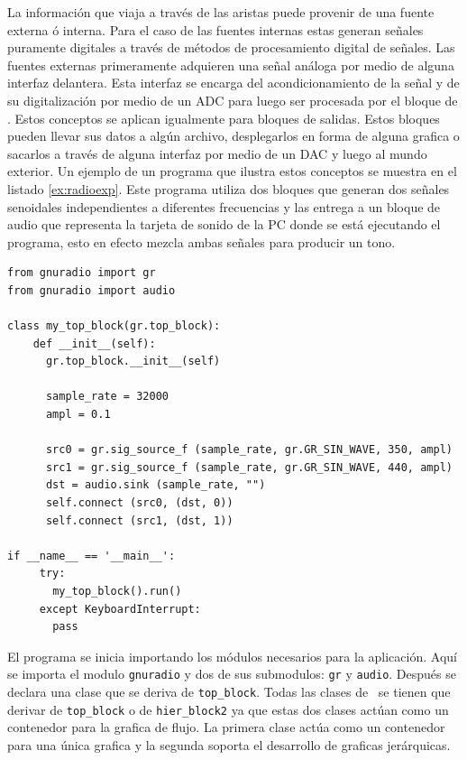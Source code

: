La informaci\'on que viaja a trav\'es de las aristas puede provenir de una fuente
externa \'o interna. Para el caso de las fuentes internas estas generan se\~nales
puramente digitales a trav\'es de m\'etodos de procesamiento digital de
se\~nales. Las fuentes externas primeramente adquieren una se\~nal an\'aloga por
medio de alguna interfaz delantera. Esta interfaz se encarga del
acondicionamiento de la se\~nal y de su digitalizaci\'on por medio de un ADC
para luego ser procesada por el bloque de \gnuradio. Estos conceptos se
aplican igualmente para bloques de salidas. Estos bloques pueden llevar sus
datos a alg\'un archivo, desplegarlos en forma de alguna grafica o sacarlos a
trav\'es de alguna interfaz por medio de un DAC y luego al mundo exterior. Un
ejemplo de un programa que ilustra estos conceptos se muestra en el listado
\ref{ex:radioexp}. Este programa utiliza dos bloques que generan dos se\~nales
senoidales independientes a diferentes frecuencias y las entrega a un bloque de audio que
representa la tarjeta de sonido de la PC donde se est\'a ejecutando el programa,
esto en efecto mezcla ambas se\~nales para producir un tono.


\lstset{language=Python,basicstyle=\footnotesize\sffamily,captionpos=b}
\begin{lstlisting}[float,frame=single,label=ex:radioexp,caption={Ejemplo de programa utilizando \gnuradio}] 
from gnuradio import gr 
from gnuradio import audio

class my_top_block(gr.top_block):
    def __init__(self):
      gr.top_block.__init__(self)

      sample_rate = 32000
      ampl = 0.1

      src0 = gr.sig_source_f (sample_rate, gr.GR_SIN_WAVE, 350, ampl)
      src1 = gr.sig_source_f (sample_rate, gr.GR_SIN_WAVE, 440, ampl)
      dst = audio.sink (sample_rate, "")
      self.connect (src0, (dst, 0))
      self.connect (src1, (dst, 1))

if __name__ == '__main__':
     try:
       my_top_block().run()
     except KeyboardInterrupt:
       pass
\end{lstlisting}

El programa se inicia importando los m\'odulos necesarios para la aplicaci\'on.
Aqu\'i se importa el modulo \verb|gnuradio| y dos de sus submodulos: \verb|gr| y
\verb|audio|. Despu\'es se declara una clase que se deriva de \verb|top_block|.
Todas las clases de \gnuradio\ se tienen que derivar de
\verb|top_block| o de \verb|hier_block2| ya que estas dos clases act\'uan como
un contenedor para la grafica de flujo. La primera clase act\'ua como un
contenedor para una \'unica grafica y la segunda soporta el desarrollo de
graficas jer\'arquicas.


